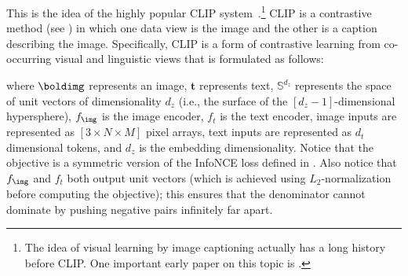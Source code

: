 This is the idea of the highly popular CLIP system~\cite{radford2021learning}.\footnote{The idea of visual learning by image captioning actually has a long history before CLIP. One important early paper on this topic is \cite{ordonez2011im2text}.} CLIP is a contrastive method (see \sect{\ref{sec:representation_learning:contrastive_learning}}) in which one data view is the image and the other is a caption describing the image. Specifically, CLIP is a form of contrastive learning from co-occurring visual and linguistic views that is formulated as follows:
\begin{center}
\end{center}
where $\boldimg$ represents an image, $\mathbf{t}$ represents text, $\mathbb{S}^{d_z}$ represents the space of unit vectors of dimensionality $d_z$ (i.e., the surface of the $[d_z-1]$-dimensional hypersphere), $f_{\img}$ is the image encoder, $f_t$ is the text encoder, image inputs are represented as $[3 \times N \times M]$ pixel arrays, text inputs are represented as $d_t$ dimensional tokens, and $d_z$ is the embedding dimensionality. Notice that the objective is a symmetric version of the InfoNCE loss defined in \eqn{\ref{eqn:representation_learning:infonce}}. Also notice that $f_\img$ and $f_t$ both output unit vectors (which is achieved using $L_2$-normalization before computing the objective); this ensures that the denominator cannot dominate by pushing negative pairs infinitely far apart.

